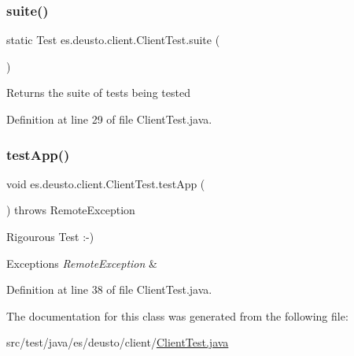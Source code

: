 \subsubsection{\texorpdfstring{suite()}{suite()}}
{\footnotesize\ttfamily static Test es.\+deusto.\+client.\+Client\+Test.\+suite (\begin{DoxyParamCaption}{ }\end{DoxyParamCaption})\hspace{0.3cm}{\ttfamily [static]}}

\begin{DoxyReturn}{Returns}
the suite of tests being tested 
\end{DoxyReturn}


Definition at line 29 of file Client\+Test.\+java.

\mbox{\label{classes_1_1deusto_1_1client_1_1_client_test_af869b513820b21f952c9754d3aea8d97}} 
\subsubsection{\texorpdfstring{test\+App()}{testApp()}}
{\footnotesize\ttfamily void es.\+deusto.\+client.\+Client\+Test.\+test\+App (\begin{DoxyParamCaption}{ }\end{DoxyParamCaption}) throws Remote\+Exception}

Rigourous Test \+:-\/)


\begin{DoxyExceptions}{Exceptions}
{\em Remote\+Exception} & \\
\hline
\end{DoxyExceptions}


Definition at line 38 of file Client\+Test.\+java.



The documentation for this class was generated from the following file\+:\begin{DoxyCompactItemize}
\item 
src/test/java/es/deusto/client/\hyperlink{_client_test_8java}{Client\+Test.\+java}\end{DoxyCompactItemize}
